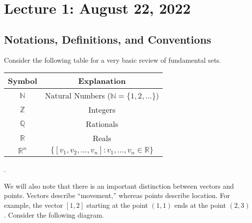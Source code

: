 \section{Lecture 1: August 22, 2022}

    \subsection{Notations, Definitions, and Conventions}

    Consider the following table for a very basic review of fundamental sets.
    \begin{center}
        \begin{tabular}{|c|c|}
            \hline
            \hline
            Symbol & Explanation \\
            \hline
            \hline
            \(\mathbb{N}\) & Natural Numbers (\(\mathbb{N}=\{1,2,\ldots\}\)) \\
            \hline
            \(\mathbb{Z}\) & Integers \\
            \hline
            \(\mathbb{Q}\) & Rationals \\
            \hline
            \(\mathbb{R}\) & Reals \\
            \hline
            \(\mathbb{R}^n\) & \(\{[v_1,v_2,\ldots,v_n]:v_1,\ldots,v_n\in\mathbb{R}\}\) \\
            \hline 
        \end{tabular}.
    \end{center}
    We will also note that there is an important distinction between vectors and points. Vectors describe ``movement,'' whereas points describe location. For example, the vector \([1,2]\) starting at the point \((1,1)\) ends at the point \((2,3)\). Consider the following diagram.
    \begin{center}
    \end{center}
